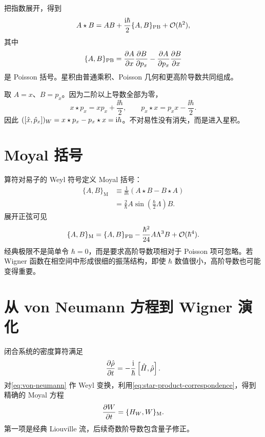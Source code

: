 把指数展开，得到
\begin{equation}
  A\star B=AB+\frac{\mathrm{i}\hbar}{2}\{A,B\}_{\mathrm{PB}}
  +\mathcal{O}(\hbar^2),
  \label{eq:star-expansion}
\end{equation}
其中
\begin{equation}
  \{A,B\}_{\mathrm{PB}}
  =\frac{\partial A}{\partial x}\frac{\partial B}{\partial p_x}
  -\frac{\partial A}{\partial p_x}\frac{\partial B}{\partial x}
\end{equation}
是 Poisson 括号。星积由普通乘积、Poisson 几何和更高阶导数共同组成。

\begin{example}
取 $A=x$、$B=p_x$。因为二阶以上导数全部为零，
\begin{equation}
  x\star p_x=x p_x+\frac{\ii\hbar}{2},
  \qquad
  p_x\star x=p_x x-\frac{\ii\hbar}{2}.
\end{equation}
因此 $(\left[\hat x,\hat p_x\right])_W=x\star p_x-p_x\star x=\mathrm{i}\hbar$。不对易性没有消失，而是进入星积。
\end{example}

\section{Moyal 括号}

算符对易子的 Weyl 符号定义 Moyal 括号：
\begin{align}
  \{A,B\}_{\mathrm{M}}
  &\equiv\frac{1}{\ii\hbar}(A\star B-B\star A)\\
  &=\frac{2}{\hbar}A
  \sin\!\left(\frac{\hbar}{2}\Lambda\right)B.
  \label{eq:moyal-bracket}
\end{align}
展开正弦可见
\begin{equation}
  \{A,B\}_{\mathrm{M}}
  =\{A,B\}_{\mathrm{PB}}
  -\frac{\hbar^2}{24}A\Lambda^3B
  +\mathcal{O}(\hbar^4).
  \label{eq:moyal-expansion}
\end{equation}
经典极限不是简单令 $\hbar=0$，而是要求高阶导数项相对于 Poisson 项可忽略。若 Wigner 函数在相空间中形成很细的振荡结构，即使 $\hbar$ 数值很小，高阶导数也可能变得重要。

\section{从 von Neumann 方程到 Wigner 演化}

闭合系统的密度算符满足
\begin{equation}
  \frac{\partial \hat\rho}{\partial t}=-\frac{\mathrm{i}}{\hbar}\left[\hat H,\hat\rho\right].
  \label{eq:von-neumann}
\end{equation}
对\cref{eq:von-neumann} 作 Weyl 变换，利用\cref{eq:star-product-correspondence}，得到精确的 Moyal 方程
\begin{equation}
  \frac{\partial W}{\partial t}=\{H_W,W\}_{\mathrm{M}}.
  \label{eq:moyal-evolution}
\end{equation}
第一项是经典 Liouville 流，后续奇数阶导数包含量子修正。

